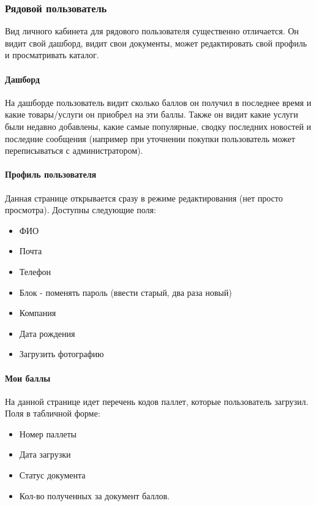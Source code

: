 \documentclass[DIV=calc, paper=a4, fontsize=11pt]{scrartcl} %
\begin{document}
\subsubsection{Рядовой пользователь}

Вид личного кабинета для рядового пользователя существенно отличается. Он видит свой дашборд, видит свои документы, может редактировать свой профиль и просматривать каталог.


\paragraph{Дашборд}

На дашборде пользователь видит сколько баллов он получил в последнее время и какие товары/услуги он приобрел на эти баллы. Также он видит какие услуги были недавно добавлены, какие самые популярные, сводку последних новостей и последние сообщения (например при уточнении покупки пользователь может переписываться с администратором).

\paragraph{Профиль пользователя}

Данная странице открывается сразу в режиме редактирования (нет просто просмотра). Доступны следующие поля:

\begin{itemize}
	\item ФИО
	\item Почта
	\item Телефон
	\item Блок - поменять пароль (ввести старый, два раза новый)
	\item Компания
	\item Дата рождения
	\item Загрузить фотографию
\end{itemize}

\paragraph{Мои баллы}

На данной странице идет перечень кодов паллет, которые пользователь загрузил. Поля в табличной форме:

\begin{itemize}
	\item Номер паллеты
	\item Дата загрузки
	\item Статус документа
	\item Кол-во полученных за документ баллов.
\end{itemize}
\end{document}
